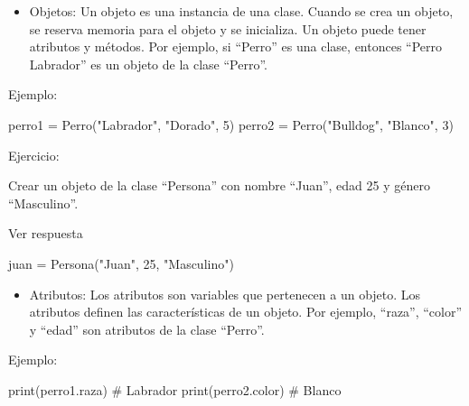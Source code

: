 \documentclass[
  a4paper,
  DIV=11,
  numbers=noendperiod,
  onepage,
  openany]{scrreprt}
\newenvironment{Shaded}{\begin{snugshade}}{\end{snugshade}}
\newcommand{\BuiltInTok}[1]{\textcolor[rgb]{0.00,0.23,0.31}{#1}}
\newcommand{\CommentTok}[1]{\textcolor[rgb]{0.37,0.37,0.37}{#1}}
\newcommand{\DecValTok}[1]{\textcolor[rgb]{0.68,0.00,0.00}{#1}}
\newcommand{\NormalTok}[1]{\textcolor[rgb]{0.00,0.23,0.31}{#1}}
\newcommand{\OperatorTok}[1]{\textcolor[rgb]{0.37,0.37,0.37}{#1}}
\newcommand{\StringTok}[1]{\textcolor[rgb]{0.13,0.47,0.30}{#1}}
\providecommand{\tightlist}{%
  \setlength{\itemsep}{0pt}\setlength{\parskip}{0pt}}\usepackage{longtable,booktabs,array}
\begin{document}
\begin{tcolorbox}
\begin{itemize}
\tightlist
\item
  Objetos: Un objeto es una instancia de una clase. Cuando se crea un
  objeto, se reserva memoria para el objeto y se inicializa. Un objeto
  puede tener atributos y métodos. Por ejemplo, si ``Perro'' es una
  clase, entonces ``Perro Labrador'' es un objeto de la clase ``Perro''.
\end{itemize}

Ejemplo:

\begin{Shaded}
\begin{Highlighting}[]
\NormalTok{perro1 }\OperatorTok{=}\NormalTok{ Perro(}\StringTok{"Labrador"}\NormalTok{, }\StringTok{"Dorado"}\NormalTok{, }\DecValTok{5}\NormalTok{)}
\NormalTok{perro2 }\OperatorTok{=}\NormalTok{ Perro(}\StringTok{"Bulldog"}\NormalTok{, }\StringTok{"Blanco"}\NormalTok{, }\DecValTok{3}\NormalTok{)}
\end{Highlighting}
\end{Shaded}

Ejercicio:

Crear un objeto de la clase ``Persona'' con nombre ``Juan'', edad 25 y
género ``Masculino''.

Ver respuesta

\begin{Shaded}
\begin{Highlighting}[]
\NormalTok{juan }\OperatorTok{=}\NormalTok{ Persona(}\StringTok{"Juan"}\NormalTok{, }\DecValTok{25}\NormalTok{, }\StringTok{"Masculino"}\NormalTok{)}
\end{Highlighting}
\end{Shaded}

\begin{itemize}
\tightlist
\item
  Atributos: Los atributos son variables que pertenecen a un objeto. Los
  atributos definen las características de un objeto. Por ejemplo,
  ``raza'', ``color'' y ``edad'' son atributos de la clase ``Perro''.
\end{itemize}

Ejemplo:

\begin{Shaded}
\begin{Highlighting}[]
\BuiltInTok{print}\NormalTok{(perro1.raza)  }\CommentTok{\# Labrador}
\BuiltInTok{print}\NormalTok{(perro2.color)  }\CommentTok{\# Blanco}
\end{Highlighting}
\end{Shaded}


\end{tcolorbox}
\end{document}
